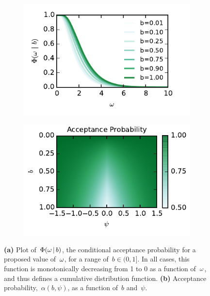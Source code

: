\begin{figure}
\centering
  \begin{subfigure}[t]{2.7in}
    \caption{}
    \label{fig:pg_phi}
    \vspace{-1em}
    \includegraphics[width=\textwidth]{figures/ch8/phi}
  \end{subfigure}
  \begin{subfigure}[t]{2.7in}
    \caption{}
    \label{fig:pg_acceptance}
    \vspace{-1em}
    \includegraphics[width=\textwidth]{figures/ch8/acceptance}
  \end{subfigure}
  \vspace{-1em}
  \caption[Rejection sampling algorithm for the \polyagamma
    distribution] {\textbf{(a)} Plot of~$\Phi({\omega} \,|\, b)$, the
    conditional acceptance probability for a proposed value
    of~${\omega}$, for a range of~$b\in (0,1]$. In all cases, this function is
  monotonically decreasing from 1 to 0 as a function of~${\omega}$, and
  thus defines a cumulative distribution function. 
  \textbf{(b)}
  Acceptance probability,~$\alpha(b,\psi)$, as a function of~$b$
  and~$\psi$.}
\label{fig:pgsampling}
\end{figure}

